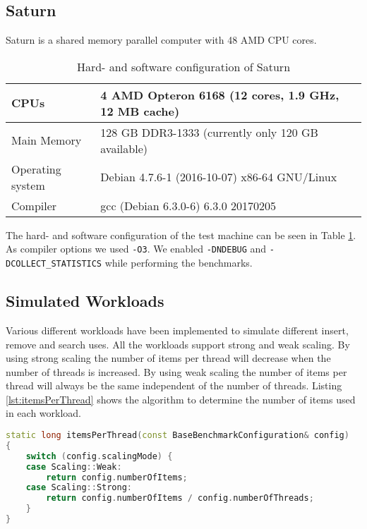 \subsection{Saturn} \label{subsec:saturn}
Saturn is a shared memory parallel computer with 48 AMD CPU cores.

\begin{table}[H]
  \caption{Hard- and software configuration of Saturn}
  \label{tab:saturn} 
  \begin{center}
    \begin{tabular}{ll}
      CPUs & 4 AMD Opteron 6168 (12 cores, 1.9 GHz, 12 MB cache)\\\hline
      Main Memory & 128 GB DDR3-1333 (currently only 120 GB available)\\\hline
      Operating system & Debian 4.7.6-1 (2016-10-07) x86-64 GNU/Linux\\\hline
      Compiler & gcc (Debian 6.3.0-6) 6.3.0 20170205
    \end{tabular}
  \end{center}
\end{table}

\noindent The hard- and software configuration of the test machine can be seen in Table \ref{tab:saturn}. As compiler options we used \verb|-O3|. We enabled \verb|-DNDEBUG| and \verb|-DCOLLECT_STATISTICS| while performing the benchmarks.

\subsection{Simulated Workloads}

Various different workloads have been implemented to simulate different insert, remove and search uses. All the workloads support strong and weak scaling. By using strong scaling the number of items per thread will decrease when the number of threads is increased. By using weak scaling the number of items per thread will always be the same independent of the number of threads. Listing \ref{lst:itemsPerThread} shows the algorithm to determine the number of items used in each workload.

\begin{lstlisting}[language=C++, caption={Items Per Thread depending on the Scaling Mode}, label=lst:itemsPerThread]
static long itemsPerThread(const BaseBenchmarkConfiguration& config)
{
    switch (config.scalingMode) {
    case Scaling::Weak:
        return config.numberOfItems;
    case Scaling::Strong:
        return config.numberOfItems / config.numberOfThreads;
    }
}
\end{lstlisting}

